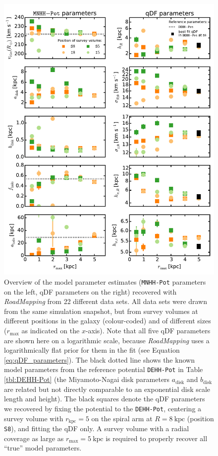 \documentclass[iop,revtex4,numberedappendix,appendixfloats]{emulateapj}
\newcommand{\RM}{{\sl RoadMapping}}
\begin{document}
\begin{figure}[!htbp]
\centering
\includegraphics[width=\columnwidth]{fig/MNdHHdiffSph2_violins_3.pdf}
\caption{Overview of the model parameter estimates (\texttt{MNHH-Pot} parameters on the left, qDF parameters on the right) recovered with \RM{} from 22 different data sets. All data sets were drawn from the same simulation snapshot, but from survey volumes at different positions in the galaxy (colour-coded) and of different sizes ($r_\text{max}$ as indicated on the $x$-axis). Note that all five qDF parameters are shown here on a logarithmic scale, because \RM{} uses a logarithmically flat prior for them in the fit (see Equation \eqref{eq:qDF_parameters}). The black dotted line shows the known model parameters from the reference potential \texttt{DEHH-Pot} in Table \ref{tbl:DEHH-Pot} (the Miyamoto-Nagai disk parameters $a_\text{disk}$ and $b_\text{disk}$ are related but not directly comparable to an exponential disk scale length and height). The black squares denote the qDF parameters we recovered by fixing the potential to the \texttt{DEHH-Pot}, centering a survey volume with $r_\text{kpc}=5$ on the spiral arm at $R=8~\text{kpc}$ (position \texttt{S8}), and fitting the qDF only. A survey volume with a radial coverage as large as $r_\text{max}=5~\text{kpc}$ is required to properly recover all ``true'' model parameters.}
\label{fig:model_parameters}
\end{figure}
\end{document}
